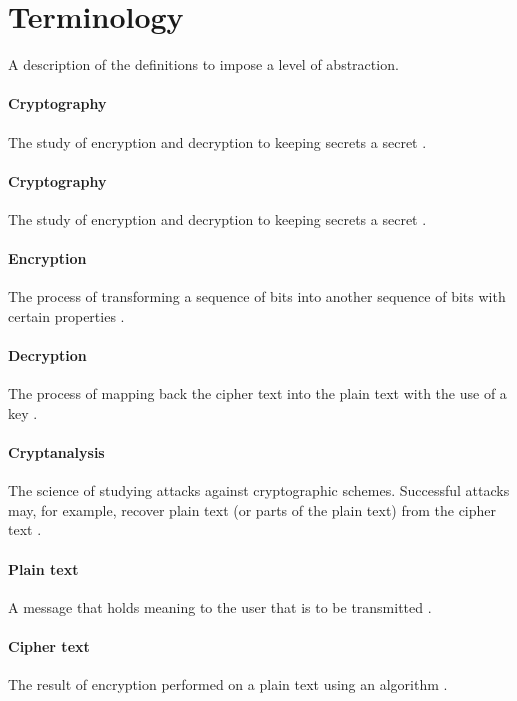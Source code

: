 \documentclass[11pt,a4paper]{report}
\begin{document}
\section{Terminology}
\label{sec:Term}
A description of the definitions to impose a level of abstraction.

\paragraph{Cryptography}
The study of encryption and decryption to keeping secrets a secret \cite{DBLP:series/isc/DelfsK07}.

\paragraph{Cryptography}
The study of encryption and decryption to keeping secrets a secret \cite{DBLP:series/isc/DelfsK07}.

\paragraph{Encryption}
The process of transforming a sequence of bits into another sequence of bits with certain properties \cite{Fabio2000LogicalSAT}.

\paragraph{Decryption}
The process of mapping back the cipher text into the plain text with the use of a key \cite{Fabio2000LogicalSAT}.

\paragraph{Cryptanalysis}
The science of studying attacks against cryptographic schemes. Successful attacks may, for example, recover plain text (or parts of the plain text) from the cipher text \cite{DBLP:books/sp/Buchmann02}.

\paragraph{Plain text}
A message that holds meaning to the user that is to be transmitted \cite{DBLP:books/sp/Buchmann02}.

\paragraph{Cipher text}
The result of encryption performed on a plain text using an algorithm \cite{Berti2003CISSP}.
\end{document}
